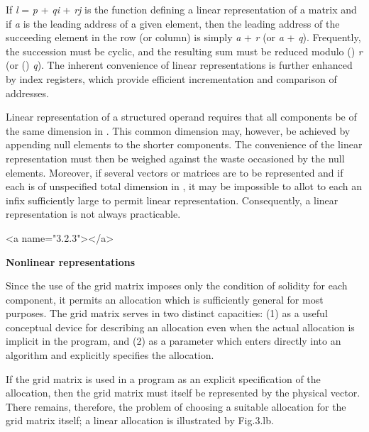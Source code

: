 {\par If \textit{l} = \textit{p} + \textit{qi} + \textit{rj} is the function defining a linear representation of a matrix  and if \textit{a} is the leading address of a given element, then the leading address of the succeeding element in the row (or column) is simply \textit{a} + \textit{r} (or \textit{a} + \textit{q}). Frequently, the succession must be cyclic, and the resulting sum must be reduced modulo 
\textit{\nu}() \times \textit{r} (or \textit{\mu}() \times \textit{q}). The inherent convenience of linear representations is further enhanced by index registers, which provide efficient incrementation and comparison of addresses.

\par Linear representation of a structured operand requires that all components be of the same dimension in \textbf{\pi}. This common dimension may, however, be achieved by appending null elements to the shorter components. The convenience of the linear representation must then be weighed against the waste occasioned by the null elements. Moreover, if several vectors or matrices are to be represented and if each is of unspecified total dimension in \textbf{\pi}, it may be impossible to allot to each an infix sufficiently large to permit linear representation. Consequently, a linear representation is not always practicable.



<a name="3.2.3"></a>
\par \textbf{Nonlinear representations}

\par Since the use of the grid matrix imposes only the condition of solidity for each component, it permits an allocation which is sufficiently general for most purposes. The grid matrix serves in two distinct capacities: (1) as a useful conceptual device for describing an allocation even when the actual allocation is implicit in the program, and (2) as a parameter which enters directly into an algorithm and explicitly specifies the allocation.

\par If the grid matrix is used in a program as an explicit specification of the allocation, then the grid matrix must itself be represented by the physical vector. There remains, therefore, the problem of choosing a suitable allocation for the grid matrix itself; a linear allocation is illustrated by Fig.3.lb.

}
